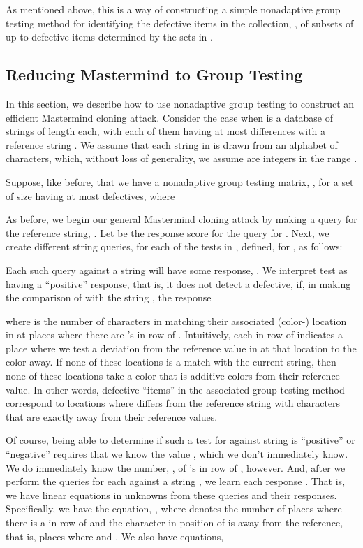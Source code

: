 \documentclass{article}
\begin{document}
As mentioned above,
this is a way of constructing a simple nonadaptive group testing method for
identifying the defective items in the collection, , of
subsets of up to  defective items determined by the sets in .

\subsection{Reducing Mastermind to Group Testing}
In this section,
we describe how to use nonadaptive group testing to
construct an efficient Mastermind cloning attack.
\label{sec:arb}
Consider the case when  is a database of  strings of length
 each, with each of them having
at most  differences with a reference string .
We assume that each string in  is drawn from an alphabet of 
characters, which, without loss of generality, we assume are integers in the
range .

Suppose, like before, that we have a  
nonadaptive group testing matrix, , for a 
set of size  having at most  defectives,
where 

As before,
we begin our general Mastermind cloning attack by making a query 
for the reference string, .
Let  be the response score for the query for .
Next, we create  different string queries,  
for each of the  tests in , defined, for , as
follows:

Each such query against a string  will have some response, .
We interpret test  as having a ``positive'' response, that is, it
does not detect a defective, if, in making the comparison of  with
the string , the response

where  is the number of
characters in  matching their associated (color-) location in 
at places where there are 's in row  of .
Intuitively, each  in row  of  indicates a place where we test
a deviation from the reference value in  at that location to 
the color  away. If none of these
locations is a match with the current  string, then none of these 
locations take a color that is  additive colors from their reference value. 
In other words, defective ``items'' in the
associated group testing method 
correspond to locations where  differs from the reference string
with characters that are exactly  away from their reference values. 

Of course, being able to determine if such a test for  against
string  is ``positive'' or
``negative'' requires that we know the value , which we don't 
immediately know.
We do immediately know the number, , 
of 's in row  of , however. And, after
we perform the queries for each  against a string , 
we learn each response .
That is, we have  linear equations in  unknowns from these
queries and their responses.  
Specifically, we have the equation,
,
where  denotes the number of places  where there is a 
 in row  of  and the character in position  of  is 
 away from the reference, that is, places
where  and .
We also have  equations,
\end{document}
